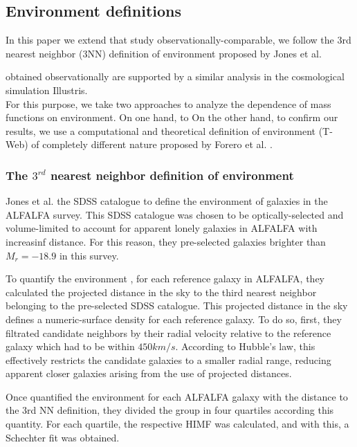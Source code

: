 \documentclass[a4paper,fleqn,usenatbib]{mnras}
\begin{document}
 

\subsection{Environment definitions}



In this paper we extend that 
study observationally-comparable, we follow the 3rd nearest neighbor
(3NN) definition of environment proposed by Jones et
al. 


obtained observationally are supported by a similar analysis in the
cosmological simulation Illustris.\\  

For this purpose, we take two approaches to analyze the dependence of mass functions on environment. 
On one hand, to On the other hand, to confirm our results, we use a computational and theoretical definition of environment (T-Web) of completely different nature proposed by Forero et al. \cite{Forero2009}. 

\subsubsection{The $3^{rd}$ nearest neighbor definition of environment}

Jones et al. \cite{Jones2016} the SDSS \cite{SDSS2011} catalogue to
define the environment of galaxies in the ALFALFA \cite{ALFALFA}
survey. 
This SDSS catalogue was chosen to be optically-selected and
volume-limited to account for apparent lonely galaxies in ALFALFA with
increasinf distance.  
For this reason, they pre-selected galaxies brighter than $M_r =
-18.9$ in this survey.

To quantify the environment , for each reference galaxy in ALFALFA,
they calculated the projected distance in the sky to the third nearest
neighbor belonging to the pre-selected SDSS catalogue. 
This projected distance in the sky defines a numeric-surface density for each reference galaxy.
To do so, first, they filtrated candidate neighbors by their radial
velocity relative to the reference galaxy which had to be within
$450km/s$. 
According to Hubble's law, this effectively restricts the candidate
galaxies to a smaller radial range, reducing apparent closer galaxies
arising from the use of projected distances.  

Once quantified the environment for each ALFALFA galaxy with the distance to the 3rd NN definition, they divided the group in four quartiles according this quantity. 
For each quartile, the respective HIMF was calculated, and with this, a Schechter fit was obtained. 
 
\end{document}
